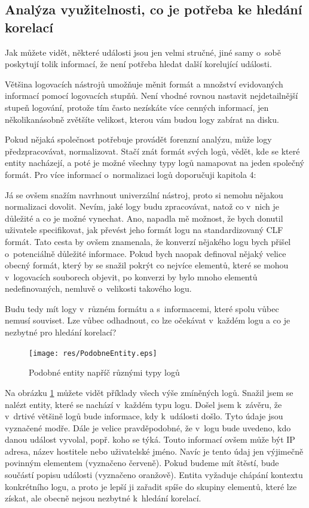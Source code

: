 \documentclass[thesis=B,czech]{FITthesis}[2012/06/26]
\begin{document}
\subsection{Analýza využitelnosti, co je potřeba ke hledání korelací}
Jak můžete vidět, některé události jsou jen velmi stručné, jiné samy o~sobě poskytují tolik informací, že není potřeba hledat další korelující události.

Většina logovacích nástrojů umožňuje měnit formát a množství evidovaných informací pomocí logovacích stupňů. Není vhodné rovnou nastavit nejdetailnější stupeň logování, protože tím často nezískáte více cenných informací, jen několikanásobně zvětšíte velikost, kterou vám budou logy zabírat na disku. \cite{auditAndTrace}

Pokud nějaká společnost potřebuje provádět forenzní analýzu, může logy předzpracovávat, normalizovat. Stačí znát formát svých logů, vědět, kde se které entity nacházejí, a poté je možné všechny typy logů namapovat na jeden společný formát. Pro více informací o~normalizaci logů doporučuji \cite{auditAndTrace} kapitola 4: 

Já se ovšem snažím navrhnout univerzální nástroj, proto si nemohu nějakou normalizaci dovolit. Nevím, jaké logy budu zpracovávat, natož co v~nich je důležité a co je možné vynechat. Ano, napadla mě možnost, že bych donutil uživatele specifikovat, jak převést jeho formát logu na standardizovaný CLF formát. Tato cesta by ovšem znamenala, že konverzí nějakého logu bych přišel o~potenciálně důležité informace. Pokud bych naopak definoval nějaký velice obecný formát, který by se snažil pokrýt co nejvíce elementů, které se mohou v~logovacích souborech objevit, po konverzi by bylo mnoho elementů nedefinovaných, nemluvě o~velikosti takového logu.

Budu tedy mít logy v~různém formátu a s~informacemi, které spolu vůbec nemusí souviset. Lze vůbec odhadnout, co lze očekávat v~každém logu a co je nezbytné pro hledání korelací?

\begin{figure}[h]
  \centering
  \texttt{[image: res/PodobneEntity.eps]}
  \caption{Podobné entity napříč různými typy logů}
  \label{fig:PodobneEntity}
\end{figure}

Na obrázku \ref{fig:PodobneEntity} můžete vidět příklady všech výše zmíněných logů. Snažil jsem se nalézt entity, které se nachází v~každém typu logu. 
Došel jsem k~závěru, že v~drtivé většině logů bude informace, kdy k~události došlo. Tyto údaje jsou vyznačené modře. Dále je velice pravděpodobné, že v~logu bude uvedeno, kdo danou událost vyvolal, popř. koho se týká. Touto informací ovšem může být IP adresa, název hostitele nebo uživatelské jméno. Navíc je tento údaj jen výjimečně povinným elementem (vyznačeno červeně). Pokud budeme mít štěstí, bude součástí popisu události (vyznačeno oranžově). Entita  vyžaduje chápání kontextu konkrétního logu, a proto je lepší ji zařadit spíše do skupiny elementů, které lze získat, ale obecně nejsou nezbytné k~hledání korelací.
\end{document}
